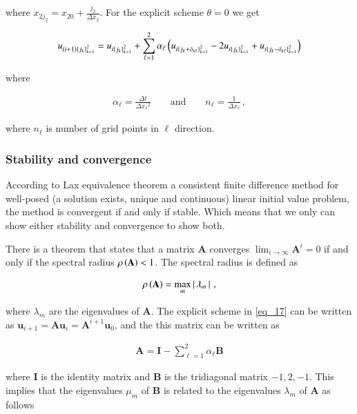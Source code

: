 \documentclass[11pt,english,a4paper]{article}
\begin{document}
\begin{flushleft}
where $x_{2 j_2} = x_{2 0}  + \frac{j_2}{\Delta x_2}$. For the explicit scheme $\theta = 0$ we get

\begin{align}
u_{(i+1)\left\lbrace{j_k}\right\rbrace_{k=1}^2} = u_{i\left\lbrace{j_k}\right\rbrace_{k=1}^2} + \sum_{\ell=1}^2 \alpha_\ell\left({u_{i\left\lbrace{j_k+\delta_{k\ell}}\right\rbrace_{k=1}^2} - 2u_{i\left\lbrace{j_k}\right\rbrace_{k=1}^2} +u_{i\left\lbrace{j_k-\delta_{k\ell}}\right\rbrace_{k=1}^2}}\right)
\label{eq_17}
\end{align}

where

\begin{align*}
\alpha_\ell = \frac{\Delta t}{\Delta {x_\ell}^2} \qquad \text{and} \qquad n_\ell = \frac{1}{\Delta x_\ell} \,,
\end{align*}

where $n_\ell$ is number of grid points in $\ell$ direction. 

\subsubsection{Stability and convergence} \label{sec_explicit_stab_conv}

According to Lax equivalence theorem a consistent finite difference method for well-posed  (a solution exists, unique and continuous) linear initial value problem, the method is convergent if and only if stable. Which means that we only can show either stability and convergence to show both. \linebreak

There is a theorem that states that a matrix $\textbf{A}$ converges $\lim_{i\to\infty} \textbf{A}^i = 0$ if and only if the spectral radius $\rho\left({\textbf{A}}\right) < 1$. The spectral radius is defined as

\begin{align*}
\rho\left({\textbf{A}}\right) = \max_m \left\vert{\,\lambda_m\,}\right\vert \,,
\end{align*}

where $\lambda_m$ are the eigenvalues of $\textbf{A}$. The explicit scheme in \eqref{eq_17}  can be written as $\textbf{u}_{i+1} = \textbf{A}\textbf{u}_i = \textbf{A}^{i+1}\textbf{u}_0$, and the this matrix can be written as

\begin{align*}
\textbf{A} = \textbf{I} - \sum_{\ell = 1}^2 \alpha_\ell \textbf{B}
\end{align*}

where $\textbf{I}$ is the identity matrix and $\textbf{B}$ is the tridiagonal matrix $-1,2,-1$. This implies that the eigenvalues $\mu_m$ of $\textbf{B}$ is related to the eigenvalues $\lambda_m$ of $\textbf{A}$ as follows


\end{flushleft}
\end{document}
